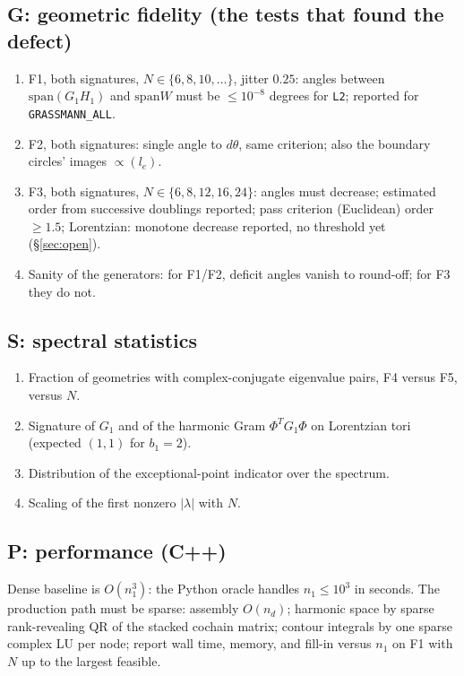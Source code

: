 \documentclass[11pt]{article}
\theoremstyle{definition}
\theoremstyle{plain}
\theoremstyle{remark}
\newcommand{\Tr}{^{T}}
\newcommand{\ttt}[1]{\texttt{#1}}
\begin{document}
\subsection*{G: geometric fidelity (the tests that found the defect)}
\begin{enumerate}[nosep,label=G\arabic*.]
\item F1, both signatures, \(N\in\{6,8,10,\dots\}\), jitter \(0.25\): angles between \(\mathrm{span}(G_1H_1)\) and \(\mathrm{span}W\) must be \(\le10^{-8}\) degrees for \ttt{L2}; reported for \ttt{GRASSMANN\_ALL}.
\item F2, both signatures: single angle to \(d\theta\), same criterion; also the boundary circles' images \(\propto(l_e)\).
\item F3, both signatures, \(N\in\{6,8,12,16,24\}\): angles must decrease; estimated order from successive doublings reported; pass criterion (Euclidean) order \(\ge1.5\); Lorentzian: monotone decrease reported, no threshold yet (\S\ref{sec:open}).
\item Sanity of the generators: for F1/F2, deficit angles vanish to round-off; for F3 they do not.
\end{enumerate}

\subsection*{S: spectral statistics}
\begin{enumerate}[nosep,label=S\arabic*.]
\item Fraction of geometries with complex-conjugate eigenvalue pairs, F4 versus F5, versus \(N\).
\item Signature of \(G_1\) and of the harmonic Gram \(\Phi\Tr G_1\Phi\) on Lorentzian tori (expected \((1,1)\) for \(b_1=2\)).
\item Distribution of the exceptional-point indicator over the spectrum.
\item Scaling of the first nonzero \(|\lambda|\) with \(N\).
\end{enumerate}

\subsection*{P: performance (C++)}
Dense baseline is \(O(n_1^3)\): the Python oracle handles \(n_1\le10^3\) in seconds. The production path must be sparse: assembly \(O(n_d)\); harmonic space by sparse rank-revealing QR of the stacked cochain matrix; contour integrals by one sparse complex LU per node; report wall time, memory, and fill-in versus \(n_1\) on F1 with \(N\) up to the largest feasible.
\end{document}

